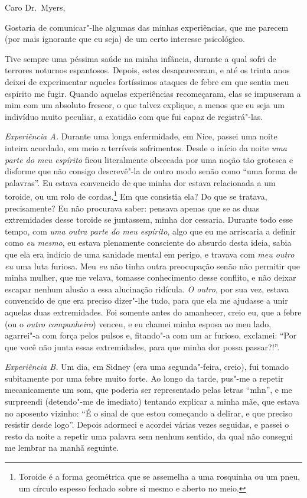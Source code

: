 \bigskip

Caro Dr.~Myers,

Gostaria de comunicar"-lhe algumas das minhas experiências, que me
parecem (por mais ignorante que eu seja) de um certo interesse
psicológico.

Tive sempre uma péssima saúde na minha infância, durante a qual sofri de
terrores noturnos espantosos.  Depois, estes desapareceram, e até os
trinta anos deixei de experimentar aqueles fortíssimos ataques de febre
em que sentia meu espírito me fugir.  Quando aquelas experiências
recomeçaram, elas se impuseram a mim com um absoluto frescor, o que
talvez explique, a menos que eu seja um indivíduo muito peculiar, a
exatidão com que fui capaz de registrá"-las. 

\textit{Experiência A.}  Durante uma longa enfermidade, em Nice, passei
uma noite inteira acordado, em meio a terríveis sofrimentos.  Desde o
início da noite \textit{uma parte do meu espírito} ficou literalmente
obcecada por uma noção tão grotesca e disforme que não consigo
descrevê"-la de outro modo senão como “uma forma de palavras”.  Eu
estava convencido de que minha dor estava relacionada a um toroide, ou
um rolo de cordas.\footnote{ Toroide é a forma geométrica
que se assemelha a uma rosquinha ou um pneu, um círculo
espesso fechado sobre si mesmo e aberto no meio.}  Em que consistia
ela? Do que se tratava, precisamente?  Eu não procurava saber: pensava
apenas que se as duas extremidades desse toroide se juntassem, minha
dor cessaria.  Durante todo esse tempo, com \textit{uma outra parte do
meu espírito}, algo que eu me arriscaria a definir como \textit{eu
mesmo}, eu estava plenamente consciente do absurdo desta ideia, sabia
que ela era indício de uma sanidade mental em perigo, e travava com
\textit{meu outro eu} uma luta furiosa.  Meu \textit{eu} não tinha
outra preocupação senão não permitir que minha mulher, que me velava,
tomasse conhecimento desse conflito, e não deixar escapar nenhum alusão
a essa alucinação ridícula.  \textit{O outro}, por sua vez, estava
convencido de que era preciso dizer"-lhe tudo, para que ela me ajudasse
a unir aquelas duas extremidades.  Foi somente antes do amanhecer,
creio eu, que a febre (ou o \textit{outro companheiro}) venceu, e eu
chamei minha esposa ao meu lado, agarrei"-a com força pelos pulsos e,
fitando"-a com um ar furioso, exclamei: “Por que você não junta essas
extremidades, para que minha dor possa passar?!”.

\textit{Experiência B.}  Um dia, em Sidney (era uma segunda"-feira,
creio), fui tomado subitamente por uma febre muito forte.  Ao longo da
tarde, pus"-me a repetir mecanicamente um som, que poderia ser
representado pelas letras “mhn”, e me surpreendi (detendo"-me de
imediato) tentando explicar a minha mãe, que estava no aposento
vizinho: “É o sinal de que estou começando a delirar, e que preciso
resistir desde logo”.  Depois adormeci e acordei várias vezes seguidas,
e passei o resto da noite a repetir uma palavra sem nenhum sentido, da
qual não consegui me lembrar na manhã seguinte.

